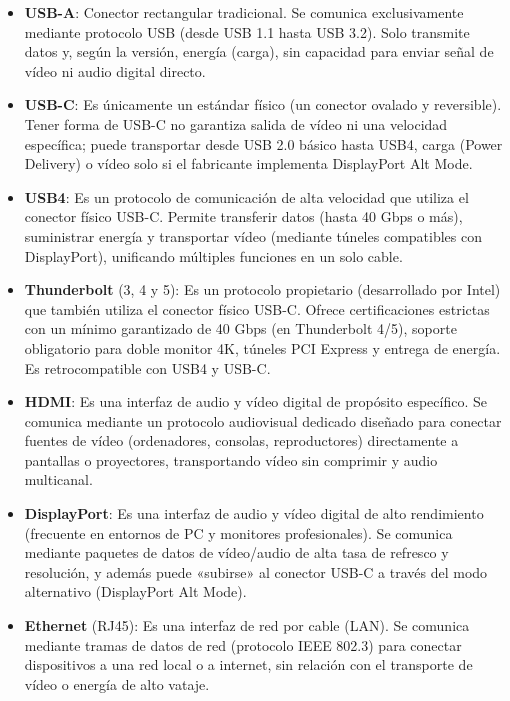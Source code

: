 \documentclass[11.5pt]{article}
\begin{document}
	\begin{itemize}
		\item \textbf{USB-A}: Conector rectangular tradicional. Se comunica exclusivamente mediante protocolo USB (desde USB 1.1 hasta USB 3.2). Solo transmite datos y, según la versión, energía (carga), sin capacidad para enviar señal de vídeo ni audio digital directo.
		\item 	\textbf{USB-C}: Es únicamente un estándar físico (un conector ovalado y reversible). Tener forma de USB-C no garantiza salida de vídeo ni una velocidad específica; puede transportar desde USB 2.0 básico hasta USB4, carga (Power Delivery) o vídeo solo si el fabricante implementa DisplayPort Alt Mode.
		\item 	\textbf{USB4}: Es un protocolo de comunicación de alta velocidad que utiliza el conector físico USB-C. Permite transferir datos (hasta 40 Gbps o más), suministrar energía y transportar vídeo (mediante túneles compatibles con DisplayPort), unificando múltiples funciones en un solo cable.
		\item 	\textbf{Thunderbolt} (3, 4 y 5): Es un protocolo propietario (desarrollado por Intel) que también utiliza el conector físico USB-C. Ofrece certificaciones estrictas con un mínimo garantizado de 40 Gbps (en Thunderbolt 4/5), soporte obligatorio para doble monitor 4K, túneles PCI Express y entrega de energía. Es retrocompatible con USB4 y USB-C.
		\item 	\textbf{HDMI}: Es una interfaz de audio y vídeo digital de propósito específico. Se comunica mediante un protocolo audiovisual dedicado diseñado para conectar fuentes de vídeo (ordenadores, consolas, reproductores) directamente a pantallas o proyectores, transportando vídeo sin comprimir y audio multicanal.
		\item 	\textbf{DisplayPort}: Es una interfaz de audio y vídeo digital de alto rendimiento (frecuente en entornos de PC y monitores profesionales). Se comunica mediante paquetes de datos de vídeo/audio de alta tasa de refresco y resolución, y además puede «subirse» al conector USB-C a través del modo alternativo (DisplayPort Alt Mode).
		\item 	\textbf{Ethernet} (RJ45): Es una interfaz de red por cable (LAN). Se comunica mediante tramas de datos de red (protocolo IEEE 802.3) para conectar dispositivos a una red local o a internet, sin relación con el transporte de vídeo o energía de alto vataje.
	\end{itemize}
	
\end{document}
